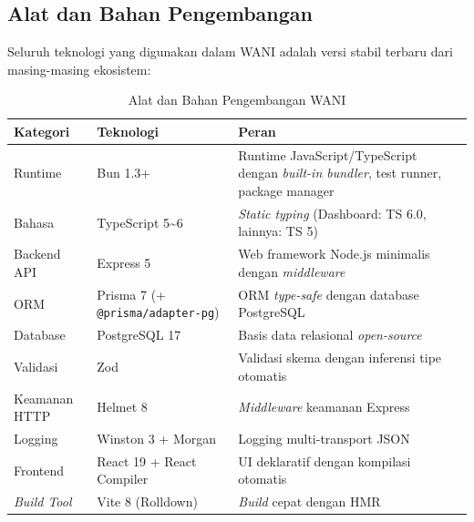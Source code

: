 \documentclass[12pt,a4paper,oneside]{article}
\newcommand{\sub}[1]{%
    \subsection{#1}%
}
\begin{document}
\sub{Alat dan Bahan Pengembangan}

Seluruh teknologi yang digunakan dalam WANI adalah versi stabil terbaru dari masing-masing ekosistem:

\begin{table}[H]
	\centering
	\caption{Alat dan Bahan Pengembangan WANI}
	\label{tab:stack}
	\begin{tabularx}{\textwidth}{p{2.8cm}p{3cm}X}
		\toprule
		\textbf{Kategori}   & \textbf{Teknologi}                       & \textbf{Peran}                                                                               \\
		\midrule
		Runtime             & Bun 1.3+                                 & Runtime JavaScript/TypeScript dengan \textit{built-in bundler}, test runner, package manager \\
		Bahasa              & TypeScript 5\textasciitilde6             & \textit{Static typing} (Dashboard: TS 6.0, lainnya: TS 5)                                    \\
		\addlinespace
		Backend API         & Express 5                                & Web framework Node.js minimalis dengan \textit{middleware}                                   \\
		ORM                 & Prisma 7 (+ \texttt{@prisma/adapter-pg}) & ORM \textit{type-safe} dengan database PostgreSQL                                            \\
		Database            & PostgreSQL 17                            & Basis data relasional \textit{open-source}                                                   \\
		Validasi            & Zod                                      & Validasi skema dengan inferensi tipe otomatis                                                \\
		Keamanan HTTP       & Helmet 8                                 & \textit{Middleware} keamanan Express                                                         \\
		Logging             & Winston 3 + Morgan                       & Logging multi-transport JSON                                                                 \\
		\addlinespace
		Frontend            & React 19 + React Compiler                & UI deklaratif dengan kompilasi otomatis                                                      \\
		\textit{Build Tool} & Vite 8 (Rolldown)                        & \textit{Build} cepat dengan HMR                                                              \\

\end{tabularx}
\end{table}
\end{document}
